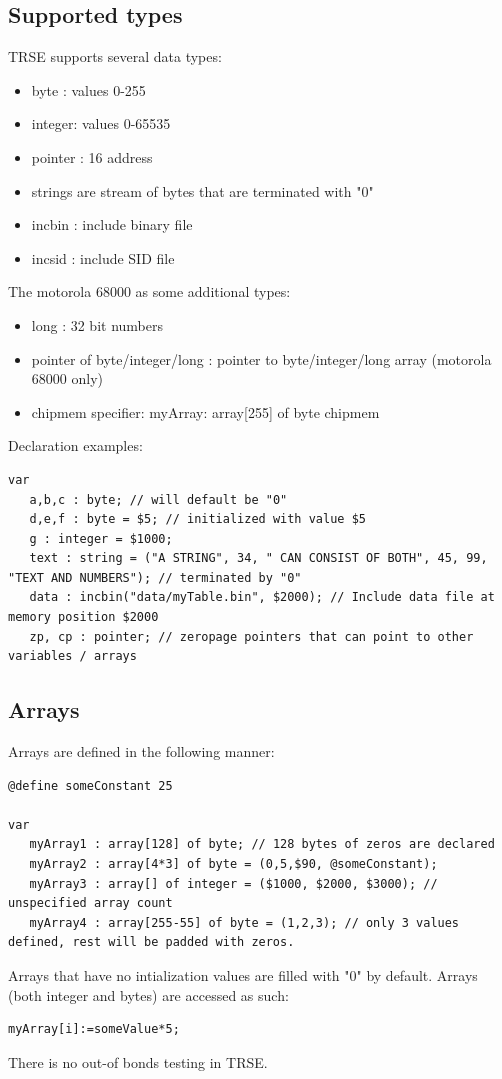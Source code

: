 \subsection{Supported types}
TRSE supports several data types:
\begin{itemize}
  \item byte : values 0-255
   \item integer: values 0-65535
  \item pointer : 16 address
  \item strings are stream of bytes that are terminated with "0"
  \item incbin : include binary file
  \item incsid : include SID file
\end{itemize}
The motorola 68000 as some additional types:
\begin{itemize}
    \item long : 32 bit numbers
    \item pointer of byte/integer/long : pointer to byte/integer/long array (motorola 68000 only)
    \item chipmem specifier: myArray: array[255] of byte chipmem
\end{itemize}
Declaration examples:
\begin{lstlisting}
var
   a,b,c : byte; // will default be "0"
   d,e,f : byte = $5; // initialized with value $5
   g : integer = $1000;
   text : string = ("A STRING", 34, " CAN CONSIST OF BOTH", 45, 99, "TEXT AND NUMBERS"); // terminated by "0"
   data : incbin("data/myTable.bin", $2000); // Include data file at memory position $2000
   zp, cp : pointer; // zeropage pointers that can point to other variables / arrays
\end{lstlisting}
\subsection{Arrays}
Arrays are defined in the following manner:
\begin{lstlisting}
@define someConstant 25
 
var
   myArray1 : array[128] of byte; // 128 bytes of zeros are declared
   myArray2 : array[4*3] of byte = (0,5,$90, @someConstant);
   myArray3 : array[] of integer = ($1000, $2000, $3000); // unspecified array count
   myArray4 : array[255-55] of byte = (1,2,3); // only 3 values defined, rest will be padded with zeros.
\end{lstlisting}
Arrays that have no intialization values are filled with "0" by default. 
Arrays (both integer and bytes) are accessed as such:
\begin{lstlisting}
myArray[i]:=someValue*5;
\end{lstlisting}
There is no out-of bonds testing in TRSE.

